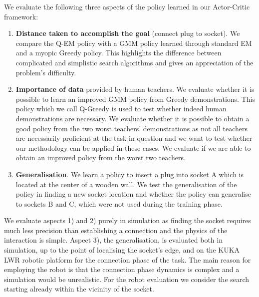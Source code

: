 \documentclass[final,3p,times,twocolumn]{elsarticle}
\begin{document}
We evaluate the following three aspects of the policy learned in our Actor-Critic framework:
\begin{enumerate}
 \item \textbf{Distance taken to accomplish the goal} (connect plug to socket). We compare the Q-EM policy with 
 a GMM policy learned through standard EM and a myopic Greedy policy. This highlights the difference between complicated and simplistic  
  search algorithms and gives an appreciation of the problem's difficulty.
 \item \textbf{Importance of data} provided by human teachers. We evaluate whether it is possible to learn 
 an improved GMM policy from Greedy demonstrations. This policy which we call Q-Greedy is used to test whether 
 indeed human demonstrations are necessary.
 We evaluate whether it is possible to obtain a good policy from the two worst teachers' demonstrations as not all teachers 
 are necessarily proficient at the task in question and we want to test whether our methodology can be applied in these
 cases. We evaluate if we  are able to obtain an improved policy from the worst two teachers.
 \item \textbf{Generalisation}. We learn a policy to insert a plug into socket A which is located at the center of a wooden 
 wall. We test the generalisation of the policy in finding a new socket location and whether the policy can generalise to sockets 
 B and C, which were not used during the training phase.
\end{enumerate}

We evaluate aspects 1) and 2) purely in simulation as finding the socket requires much less precision than establishing a 
connection and the physics of the interaction is simple. Aspect 3), the generalisation, is evaluated both in simulation,
up to the point of localising the socket's edge, and on the KUKA LWR robotic platform
for the connection phase of the task. The main reason for employing the robot is that the connection phase dynamics is 
complex and a simulation would be unrealistic. For the robot evaluation we consider 
the search starting already within the vicinity of the socket.


\end{document}
